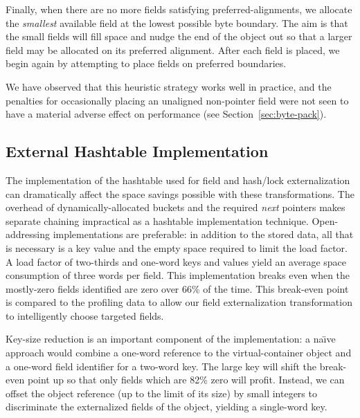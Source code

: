 \documentclass{sig-alt-full}
\begin{document}
Finally, when there are no more fields satisfying
preferred-alignments, we
allocate the {\it smallest} available field at the lowest possible
byte boundary.
The aim is that the small fields will fill space and nudge
the end of the object out so that a larger field may be allocated on
its preferred alignment.  After each field is placed, we begin again
by attempting to place fields on preferred boundaries.

We have observed that this heuristic strategy works well in practice,
and the penalties for occasionally placing an unaligned non-pointer
field were not seen to have a material adverse effect on performance (see
Section~\ref{sec:byte-pack}). 



\subsection{External Hashtable Implementation}
\label{sec:extern-impl}

The implementation of the hashtable used for field and hash/lock
externalization can dramatically affect the space savings possible
with these transformations.  The overhead of
dynamically-allocated buckets and the required {\it next} pointers
makes separate chaining impractical as a hashtable implementation technique.
Open-addressing
implementations are preferable: in addition to the stored data,
all that is necessary is a key value and the empty space required to
limit the load factor.  A load factor of two-thirds and one-word keys
and values yield an average space consumption of three words per
field.  This implementation breaks even when the mostly-zero fields
identified are zero over 66\% of the time.  This break-even point is
compared to the profiling data to allow our field externalization
transformation to intelligently choose targeted fields.

Key-size reduction is an important component of the implementation:
a na{\"\i}ve approach
would combine a one-word reference to the virtual-container object and a
one-word field identifier for a two-word key.  The large key will
shift the break-even point up so that only fields which are 82\% zero
will profit.  Instead, we can offset the
object reference (up to the limit of its size) by small integers
to discriminate the externalized fields of the object, yielding
a single-word key.
\end{document}
